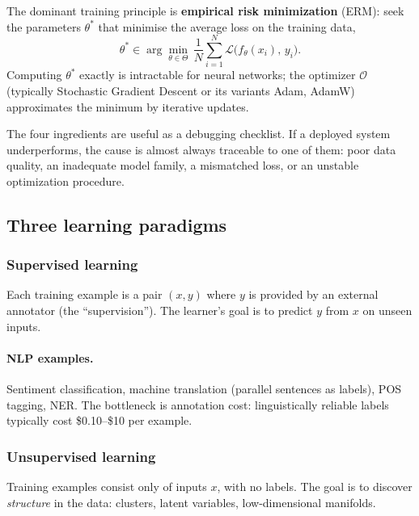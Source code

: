 \begin{definition}
The dominant training principle is \textbf{empirical risk minimization} (ERM): seek the parameters $\theta^*$ that minimise the average loss on the training data,
\[ \theta^* \in \arg\min_{\theta \in \Theta}\, \frac{1}{N} \sum_{i=1}^{N} \mathcal{L}\big(f_\theta(x_i),\, y_i\big). \]
Computing $\theta^*$ exactly is intractable for neural networks; the optimizer $\mathcal{O}$ (typically Stochastic Gradient Descent or its variants Adam, AdamW) approximates the minimum by iterative updates.
\end{definition}

\begin{remark}
The four ingredients are useful as a debugging checklist. If a deployed system underperforms, the cause is almost always traceable to one of them: poor data quality, an inadequate model family, a mismatched loss, or an unstable optimization procedure.
\end{remark}

\subsection{Three learning paradigms}

\subsubsection*{Supervised learning}

\begin{definition}
Each training example is a pair $(x, y)$ where $y$ is provided by an external annotator (the ``supervision''). The learner's goal is to predict $y$ from $x$ on unseen inputs.
\end{definition}

\paragraph{NLP examples.} Sentiment classification, machine translation (parallel sentences as labels), POS tagging, NER. The bottleneck is annotation cost: linguistically reliable labels typically cost \$0.10--\$10 per example.

\subsubsection*{Unsupervised learning}

\begin{definition}
Training examples consist only of inputs $x$, with no labels. The goal is to discover \emph{structure} in the data: clusters, latent variables, low-dimensional manifolds.
\end{definition}

